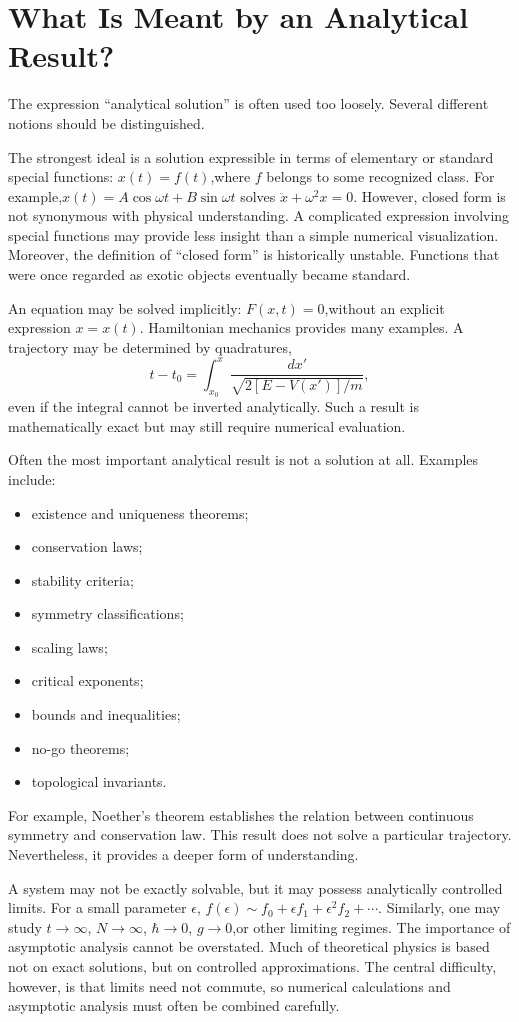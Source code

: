 \section{ What Is Meant by an Analytical Result?}
\label{nm:an}

The expression ``analytical solution'' is often used too loosely. Several
different notions should be distinguished.

The strongest ideal is a solution expressible in terms of elementary or standard special functions:
$x(t)=f(t)$,where $f$ belongs to some recognized class.
For example,$x(t)=A\cos\omega t+B\sin\omega t$ solves $\ddot{x}+\omega^2x=0$.
However, closed form is not synonymous with physical understanding. A
complicated expression involving special functions may provide less insight
than a simple numerical visualization.
Moreover, the definition of ``closed form'' is historically unstable. Functions
that were once regarded as exotic objects eventually became standard.

An equation may be solved implicitly: $F(x,t)=0$,without an explicit expression $x=x(t)$.
Hamiltonian mechanics provides many examples. A trajectory may be determined by quadratures,
\[t-t_0=\int_{x_0}^{x}\frac{dx'}{\sqrt{2[E-V(x')]/m}},\]
even if the integral cannot be inverted analytically.
Such a result is mathematically exact but may still require numerical evaluation.

Often the most important analytical result is not a solution at all.
Examples include:
\begin{itemize}
   \item  existence and uniqueness theorems;
   \item  conservation laws;
   \item  stability criteria;
   \item  symmetry classifications;
   \item  scaling laws;
   \item  critical exponents;
   \item  bounds and inequalities;
   \item  no-go theorems;
   \item  topological invariants.
\end{itemize}
For example, Noether's theorem establishes the relation between continuous symmetry
and conservation law. This result does not solve a particular trajectory. Nevertheless, 
it provides a deeper form of understanding.

A system may not be exactly solvable, but it may possess analytically controlled limits.
For a small parameter $\epsilon$, $f(\epsilon)\sim f_0+\epsilon f_1+\epsilon^2 f_2+\cdots$.
Similarly, one may study $t\rightarrow\infty$, $N\rightarrow\infty$, $\hbar\rightarrow 0$,
$g\rightarrow 0$,or other limiting regimes.
The importance of asymptotic analysis cannot be overstated. Much of theoretical physics is based not 
on exact solutions, but on controlled approximations.
The central difficulty, however, is that limits need not commute, %
so numerical calculations and asymptotic analysis must often be combined carefully.

